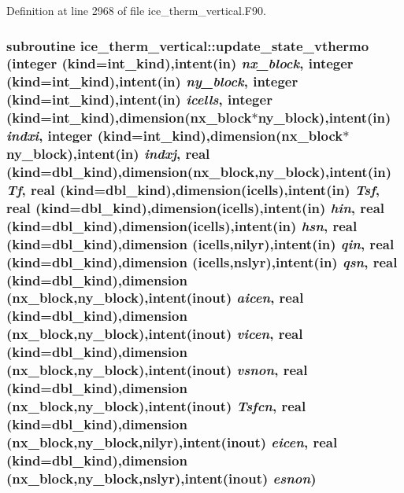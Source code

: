 Definition at line 2968 of file ice\_\-therm\_\-vertical.F90.\hypertarget{namespaceice__therm__vertical_a64f63f03c5a0e61472486ace19c6b9d5}{
\subsubsection[{update\_\-state\_\-vthermo}]{\setlength{\rightskip}{0pt plus 5cm}subroutine ice\_\-therm\_\-vertical::update\_\-state\_\-vthermo (integer (kind=int\_\-kind),intent(in) {\em nx\_\-block}, \/  integer (kind=int\_\-kind),intent(in) {\em ny\_\-block}, \/  integer (kind=int\_\-kind),intent(in) {\em icells}, \/  integer (kind=int\_\-kind),dimension(nx\_\-block$\ast$ny\_\-block),intent(in) {\em indxi}, \/  integer (kind=int\_\-kind),dimension(nx\_\-block$\ast$ny\_\-block),intent(in) {\em indxj}, \/  real (kind=dbl\_\-kind),dimension(nx\_\-block,ny\_\-block),intent(in) {\em Tf}, \/  real (kind=dbl\_\-kind),dimension(icells),intent(in) {\em Tsf}, \/  real (kind=dbl\_\-kind),dimension(icells),intent(in) {\em hin}, \/  real (kind=dbl\_\-kind),dimension(icells),intent(in) {\em hsn}, \/  real (kind=dbl\_\-kind),dimension (icells,nilyr),intent(in) {\em qin}, \/  real (kind=dbl\_\-kind),dimension (icells,nslyr),intent(in) {\em qsn}, \/  real (kind=dbl\_\-kind),dimension (nx\_\-block,ny\_\-block),intent(inout) {\em aicen}, \/  real (kind=dbl\_\-kind),dimension (nx\_\-block,ny\_\-block),intent(inout) {\em vicen}, \/  real (kind=dbl\_\-kind),dimension (nx\_\-block,ny\_\-block),intent(inout) {\em vsnon}, \/  real (kind=dbl\_\-kind),dimension (nx\_\-block,ny\_\-block),intent(inout) {\em Tsfcn}, \/  real (kind=dbl\_\-kind),dimension (nx\_\-block,ny\_\-block,nilyr),intent(inout) {\em eicen}, \/  real (kind=dbl\_\-kind),dimension (nx\_\-block,ny\_\-block,nslyr),intent(inout) {\em esnon})}}
\label{namespaceice__therm__vertical_a64f63f03c5a0e61472486ace19c6b9d5}


